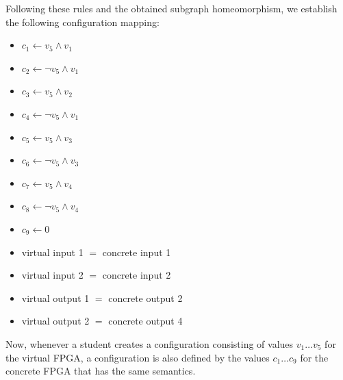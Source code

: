 Following these rules and the obtained subgraph homeomorphism, we establish the following configuration mapping:

\begin{itemize}
\item $c_1 \longleftarrow v_5 \land v_1$
\item $c_2 \longleftarrow \lnot v_5 \land v_1$
\item $c_3 \longleftarrow v_5 \land v_2$
\item $c_4 \longleftarrow \lnot v_5 \land v_1$
\item $c_5 \longleftarrow v_5 \land v_3$
\item $c_6 \longleftarrow \lnot v_5 \land v_3$
\item $c_7 \longleftarrow v_5 \land v_4$
\item $c_8 \longleftarrow \lnot v_5 \land v_4$
\item $c_9 \longleftarrow 0$
\item virtual input 1 $=$ concrete input 1
\item virtual input 2 $=$ concrete input 2
\item virtual output 1 $=$ concrete output 2
\item virtual output 2 $=$ concrete output 4
\end{itemize}

Now, whenever a student creates a configuration consisting of values $v_1 \dots v_5$ for the virtual FPGA, a configuration is also defined by the values $c_1 \dots c_9$ for the concrete FPGA that has the same semantics.

